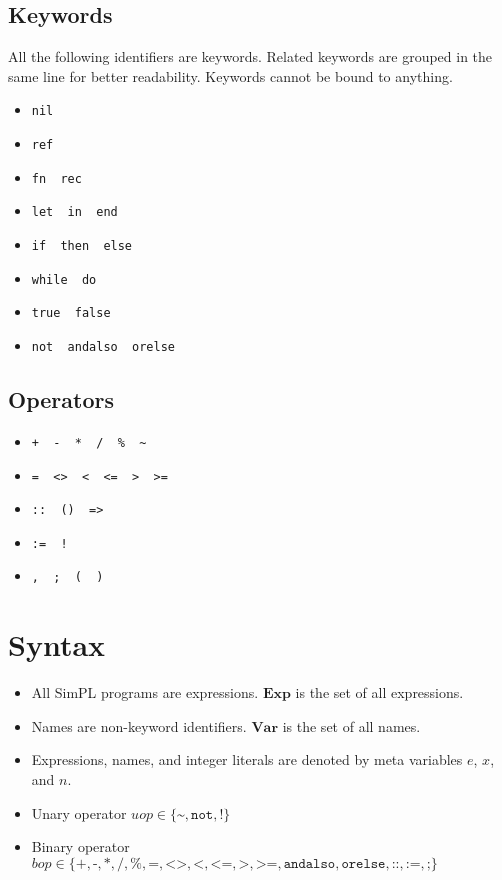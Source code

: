 \documentclass{article}
\begin{document}
\subsection{Keywords}

All the following identifiers are keywords.
Related keywords are grouped in the same line for better readability.
Keywords cannot be bound to anything.

\begin{itemize}
  \item \texttt{nil}
  \item \texttt{ref}
  \item \texttt{fn \ rec}
  \item \texttt{let \ in \ end}
  \item \texttt{if \ then \ else}
  \item \texttt{while \ do}
  \item \texttt{true \ false}
  \item \texttt{not \ andalso \ orelse}
\end{itemize}

\subsection{Operators}

\begin{itemize}
  \item \texttt{+ \ - \ * \ / \ \% \ \~}
  \item \texttt{= \ <> \ < \ <= \ > \ >=}
  \item \texttt{:: \ () \ =>}
  \item \texttt{:= \ !}
  \item \texttt{, \ ; \ ( \ )}
\end{itemize}

\section{Syntax}

\begin{itemize}
  \item All SimPL programs are expressions.  $\mathbf{Exp}$ is the set of all expressions.
  \item Names are non-keyword identifiers.  $\mathbf{Var}$ is the set of all names.
  \item Expressions, names, and integer literals are denoted by meta variables $e$, $x$, and $n$.
  \item Unary operator $uop \in \{ \texttt{\textasciitilde}, \texttt{not}, \texttt{!} \}$
  \item Binary operator $bop \in \{ \texttt{+}, \texttt{-}, \texttt{*}, \texttt{/}, \texttt{\%}, \texttt{=}, \texttt{<>}, \texttt{<}, \texttt{<=}, \texttt{>}, \texttt{>=}, \texttt{andalso}, \texttt{orelse}, \texttt{::}, \texttt{:=}, \texttt{;} \}$
\end{itemize}
\end{document}
